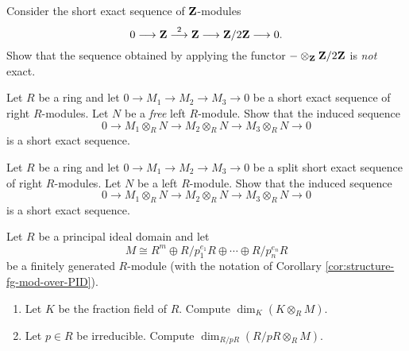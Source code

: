 \begin{exercise}\label{exc:tensor-not-exact}
Consider the short exact sequence of ${\mathbf{Z}}$-modules
\[
	0 \longrightarrow {\mathbf{Z}} \overset{2}{\longrightarrow} {\mathbf{Z}} \longrightarrow {\mathbf{Z}}/2{\mathbf{Z}} \longrightarrow 0.
\]
Show that the sequence obtained by applying the functor $-\otimes_{\mathbf{Z}} {\mathbf{Z}}/2{\mathbf{Z}}$ is \emph{not} exact.
\end{exercise}



\begin{exercise}\label{exc:tensor-with-free-is-exact}
Let $R$ be a ring and let $0\to M_1\to M_2 \to M_3\to 0$ be a short exact sequence of right $R$-modules. Let $N$ be a \emph{free} left $R$-module. Show that the induced sequence
\[
	0 \to M_1\otimes_R N \to M_2 \otimes_R N \to M_3 \otimes_R N \to 0
\]
is a short exact sequence.
\end{exercise}


\begin{exercise}
Let $R$ be a ring and let $0\to M_1\to M_2 \to M_3\to 0$ be a split short exact sequence of right $R$-modules. Let $N$ be a left $R$-module. Show that the induced sequence
\[
	0 \to M_1\otimes_R N \to M_2 \otimes_R N \to M_3 \otimes_R N \to 0
\]
is a short exact sequence.
\end{exercise}

\begin{exercise}Let $R$ be a principal ideal domain and let
\[
	M \cong R^m \oplus R/p_1^{e_1}R \oplus \cdots \oplus R/p_n^{e_n}R
\]
 be a finitely generated $R$-module (with the notation of Corollary \ref{cor:structure-fg-mod-over-PID}). 
 \begin{enumerate}
 \item Let $K$ be the fraction field of $R$. Compute $\dim_K(K\otimes_R M)$.
 \item Let $p\in R$ be irreducible. Compute $\dim_{R/pR}(R/pR \otimes_R M)$.
 \end{enumerate}
\end{exercise}

